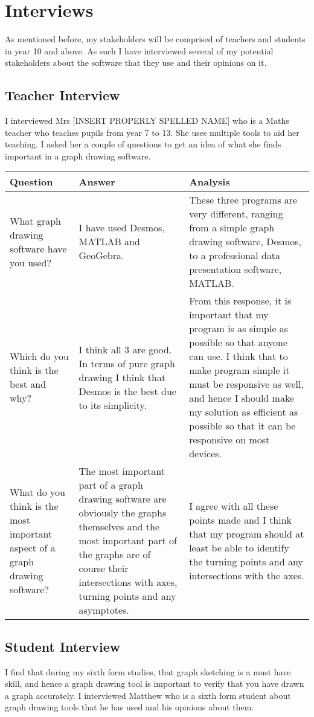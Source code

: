 \documentclass[../../../main.tex]{subfiles}
\begin{document}
\chapter{Interviews}
As mentioned before, my stakeholders will be comprised of teachers and students in year 10 and above. As such I have interviewed several of my potential stakeholders about the software that they use and their opinions on it. 
\section{Teacher Interview}
I interviewed Mrs [INSERT PROPERLY SPELLED NAME] who is a Maths teacher who teaches pupils from year 7 to 13. She uses multiple tools to aid her teaching. I asked her a couple of questions to get an idea of what she finds important in a graph drawing software.

\begin{table}[H]
\begin{tabularx}{\textwidth}{@{} Y Y Y @{}}
\toprule
Question & Answer & Analysis \\
\midrule
What graph drawing software have you used? & I have used Desmos, MATLAB and GeoGebra. & These three programs are very different, ranging from a simple graph drawing software, Desmos, to a professional data presentation software, MATLAB.
 \\ \addlinespace \midrule
Which do you think is the best and why? & I think all 3 are good. In terms of pure graph drawing I think
that Desmos is the best due to its simplicity. & From this response, it is important that my program is as simple as possible so that anyone can use. I think that to make program simple it must be responsive as well, and hence I should make my solution as efficient as possible so that it can be responsive on most devices. \\ \addlinespace \midrule
What do you think is the most important
aspect of a graph drawing software? & The most important part of a graph drawing software are obviously the graphs themselves and the most important part of the graphs are of course their intersections with axes, turning points and any asymptotes. & I agree with all these points made and I think that my program should at least be able to identify the turning points and any intersections with the axes.\\
\bottomrule
\end{tabularx}
\end{table}


\newpage
\section{Student Interview}
I find that during my sixth form studies, that graph sketching is a must have skill, and hence a graph drawing tool is important to verify that you have drawn a graph accurately. I interviewed Matthew who is a sixth form student about graph drawing tools that he has used and his opinions about them.
\end{document}
